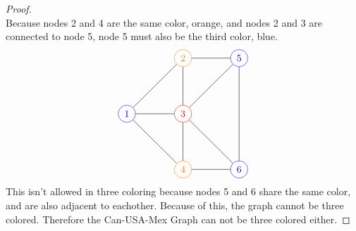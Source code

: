 \documentclass[10 pt]{amsart}
\theoremstyle{definition}
\theoremstyle{remark}
\numberwithin{equation}{subsection}
\begin{document}
\begin{proof}
\[\]
Because nodes 2 and 4 are the same color, orange, and nodes 2 and 3 are connected to node 5, node 5 must also be the third color, blue.
\[
\begin{tikzpicture}
\node[circle, draw, color=blue] (1) at (0,2){1};
\node[circle, draw, color=orange] (2) at (2,4){2};
\node[circle, draw, color=red] (3) at (2,2){3};
\node[circle, draw, color=orange] (4) at (2,0){4};
\node[circle, draw, color=blue] (5) at (4,4){5};
\node[circle, draw, color=blue] (6) at (4,0){6};
\foreach \from/\to in 
{1/2,1/3,1/4,2/3,2/5,5/3,5/6,3/4,3/6,4/6}
\draw (\from) -- (\to);
\end{tikzpicture}
\]
This isn't allowed in three coloring because nodes 5 and 6 share the same color, and are also adjacent to eachother.
\newline
\newline
Because of this, the graph cannot be three colored.
\newline
Therefore the Can-USA-Mex Graph can not be three colored either.
\end{proof}
\end{document}
